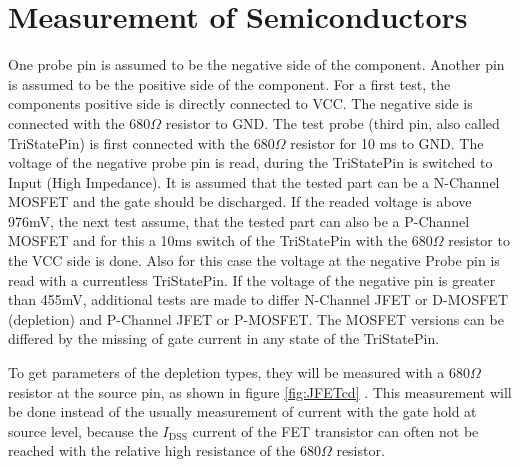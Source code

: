 \section{Measurement of Semiconductors}
One probe pin is assumed to be the negative side of the component.
Another pin is assumed to be the positive side of the component.
For a first test, the components positive side is directly connected to VCC.
The negative side is connected with the \(680\Omega\) resistor to GND.
The test probe (third pin, also called TriStatePin) is first connected with the \(680\Omega\) resistor
for 10 ms to GND.
The voltage of the negative probe pin is read, during  the TriStatePin is
switched to Input (High Impedance).
It is assumed that the tested part can be
a N-Channel MOSFET and the gate should be discharged.
If the readed voltage is above 976mV, the next test assume, that the tested part can
also be a P-Channel MOSFET and for this a 10ms switch of the TriStatePin with the \(680\Omega\) resistor
to the VCC side is done.
Also for this case the voltage at the negative Probe pin is read with a currentless TriStatePin.
If the voltage of the negative pin is greater than 455mV, additional tests are made to differ
N-Channel JFET or D-MOSFET (depletion) and P-Channel JFET or P-MOSFET. 
The MOSFET versions can be differed by the missing of gate current in any state
of the TriStatePin.

To get parameters of the depletion types, they will be measured with a \(680 \Omega\) resistor at
the source pin, as shown in figure \ref{fig:JFETcd} . This measurement will be done instead of the
usually measurement of current with the gate hold at source level, because
the \(I_\mathrm{DSS}\) current of the FET transistor can often not be reached
with the relative high resistance of the \(680 \Omega\) resistor.

